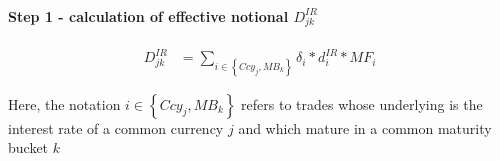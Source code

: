 \documentclass[11pt]{article}
\begin{document}
\hypertarget{step-1---calculation-of-effective-notional-d_jkir}{%
\paragraph{\texorpdfstring{Step 1 - calculation of effective notional
\(D_{jk}^{IR}\)}{Step 1 - calculation of effective notional D\_\{jk\}\^{}\{IR\}}}\label{step-1---calculation-of-effective-notional-d_jkir}}

\begin{align*}
D_{jk}^{IR} &= \sum_{i\in\left\{Ccy_j, MB_k\right\}}{\delta_i*d_i^{IR}*MF_i}
\end{align*}

Here, the notation \(i\in\left\{Ccy_j, MB_k\right\}\) refers to trades
whose underlying is the interest rate of a common currency \(j\) and
which mature in a common maturity bucket \(k\)
\end{document}
